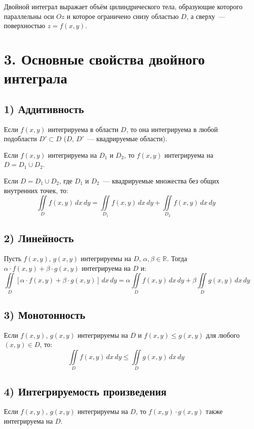 \documentclass[17pt,a4paper]{extreport}
\begin{document}
Двойной интеграл выражает объём цилиндрического тела, образующие которого параллельны оси $Oz$ и которое ограничено снизу областью $D$, а сверху~--- поверхностью $z = f(x,y)$.

\newpage

\section{3. Основные свойства двойного интеграла}

\subsection{1) Аддитивность}

Если $f(x,y)$ интегрируема в области $D$, то она интегрируема в любой подобласти $D' \subset D$ ($D$, $D'$~--- квадрируемые области).

Если $f(x,y)$ интегрируема на $D_1$ и $D_2$, то $f(x,y)$ интегрируема на $D = D_1 \cup D_2$.

Если $D = D_1 \cup D_2$, где $D_1$ и $D_2$~--- квадрируемые множества без общих внутренних точек, то:
\[
\iint\limits_D f(x,y)\,dx\,dy = \iint\limits_{D_1} f(x,y)\,dx\,dy + \iint\limits_{D_2} f(x,y)\,dx\,dy
\]

\subsection{2) Линейность}

Пусть $f(x,y)$, $g(x,y)$ интегрируемы на $D$, $\alpha, \beta \in \mathbb{R}$. Тогда $\alpha \cdot f(x,y) + \beta \cdot g(x,y)$ интегрируема на $D$ и:
\[
\iint\limits_D [\alpha \cdot f(x,y) + \beta \cdot g(x,y)]\,dx\,dy = \alpha \iint\limits_D f(x,y)\,dx\,dy + \beta \iint\limits_D g(x,y)\,dx\,dy
\]

\subsection{3) Монотонность}

Если $f(x,y)$, $g(x,y)$ интегрируемы на $D$ и $f(x,y) \leq g(x,y)$ для любого $(x,y) \in D$, то:
\[
\iint\limits_D f(x,y)\,dx\,dy \leq \iint\limits_D g(x,y)\,dx\,dy
\]

\subsection{4) Интегрируемость произведения}

Если $f(x,y)$, $g(x,y)$ интегрируемы на $D$, то $f(x,y) \cdot g(x,y)$ также интегрируема на $D$.
\end{document}
